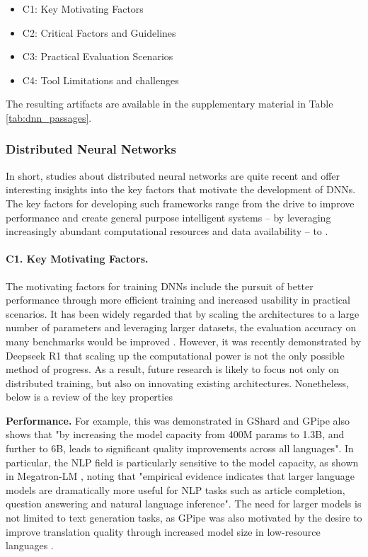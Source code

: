 \begin{itemize}
	\item C1: Key Motivating Factors
	\item C2: Critical Factors and Guidelines
	\item C3: Practical Evaluation Scenarios
	\item C4: Tool Limitations and challenges
\end{itemize}

The resulting artifacts are available in the supplementary material in Table
\ref{tab:dnn_passages}.

\subsubsection{Distributed Neural Networks}
In short, studies about distributed neural networks are quite recent and offer interesting insights
into the key factors that motivate the development of DNNs. The key factors for developing such
frameworks range from the drive to improve performance and create general purpose intelligent
systems \cite{chen_mxnet_2015,lepikhin_gshard_2020,shoeybi_megatron-lm_2020} -- by leveraging 
increasingly abundant computational resources and data availability -- to .



\paragraph{C1. Key Motivating Factors.}
The motivating factors for training DNNs include the pursuit of better performance through more
efficient training and increased usability in practical scenarios. It has been widely regarded that
by scaling the architectures to a large number of parameters and leveraging larger datasets, the
evaluation accuracy on many benchmarks would be improved \cite{hestness_deep_2017}. However, it was
recently demonstrated by Deepseek R1
\cite{deepseekai2025deepseekr1incentivizingreasoningcapability} that scaling up the computational
power is not the only possible method of progress. As a result, future research is likely to focus
not only on distributed training, but also on innovating existing architectures. Nonetheless, below
is a review of the key properties

\textbf{Performance.}
For example, this was demonstrated in GShard \cite{kaplan_scaling_2020} and GPipe
\cite{huang_gpipe_2019} also shows that "by increasing the model capacity from 400M params to 1.3B,
and further to 6B, leads to significant quality improvements across all languages". In particular,
the NLP field is particularly sensitive to the model capacity, as shown in Megatron-LM
\cite{shoeybi_megatron-lm_2020}, noting that "empirical evidence indicates that larger language
models are dramatically more useful for NLP tasks such as article completion, question answering
and natural language inference". The need for larger models is not limited to text generation
tasks, as GPipe was also motivated by the desire to improve translation quality through increased
model size in low-resource languages \cite{huang_gpipe_2019}.

